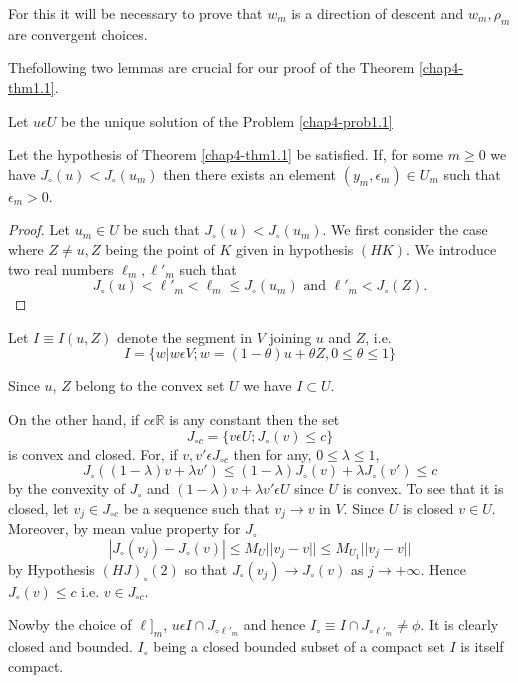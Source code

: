For this it will be necessary to prove that $w_{m}$ is a direction of descent and $w_{m}, \rho_{m}$ are convergent choices.

The\pageoriginale following two lemmas are crucial for our proof of the Theorem \ref{chap4-thm1.1}. 

Let $u \epsilon U$ be the unique solution of the Problem \ref{chap4-prob1.1}

\begin{lemma}\label{chap4-lem1.1}
Let the hypothesis of Theorem \ref{chap4-thm1.1} be satisfied. If, for some $m \geq 0$ we have $J_{\circ}(u) < J_{\circ} (u_{m})$ then there exists an element $(y_{m}, \epsilon_{m}) \in U_{m}$ such that $\epsilon_{m} > 0$.
\end{lemma}

\begin{proof}
Let $u_{m} \in U$ be such that $J_{\circ}(u) < J_{\circ}(u_{m})$. We first consider the case where $Z \neq u, Z$ being the point of $K$ given in hypothesis $(HK)$. We introduce two real numbers $\ell_{m}, \ell'_{m}$ such that
$$
J_{\circ}(u) < \ell'_{m} < \ell_{m} \leq J_{\circ} (u_{m}) \text{ and } \ell'_{m} < J_{\circ}(Z).
$$
\end{proof}

Let $I \equiv I(u, Z)$ denote the segment in $V$ joining $u$ and $Z$, i.e.
$$
I = \{w | w \epsilon V ; w = (1-\theta)u + \theta Z, 0 \leq \theta \leq 1\}
$$

Since $u$, $Z$ belong to the convex set $U$ we have $I \subset U$.

On the other hand, if $c \epsilon \mathbb{R}$ is any constant then the set
$$
J_{\circ c} = \{v \epsilon U; J_{\circ} (v) \leq c\}
$$
is convex and closed. For, if $v, v' \epsilon J_{\circ c}$ then for any, $0 \leq \lambda \leq 1$,
$$
J_{\circ} ((1-\lambda)v + \lambda v') \leq (1 - \lambda)J_{\circ}(v) + \lambda J_{\circ} (v') \leq c
$$
by the convexity of $J_{\circ}$ and $(1-\lambda)v + \lambda v' \epsilon U$ since $U$ is convex. To see that it is closed, let $v_{j} \in J_{\circ c}$ be a sequence such that $v_{j} \to v$ in $V$. Since $U$ is closed $v \in U$. Moreover, by mean value property for $J_{\circ}$
$$
|J_{\circ}(v_{j}) - J_{\circ}(v)| \leq M_{U} ||v_{j}-v|| \leq M_{U_{1}} ||v_{j}-v||
$$
by Hypothesis $(HJ)_{\circ} (2)$ so that $J_{\circ} (v_{j}) \to J_{\circ}(v)$ as $j \to + \infty$. Hence $J_{\circ}(v) \leq c$ i.e. $v \in J_{\circ c}$.

Now\pageoriginale by the choice of $\ell]_{m}$, $u \epsilon I \cap J_{\circ \ell'_{m}}$ and hence $I_{\circ} \equiv I \cap J_{\circ \ell'_{m}} \neq \phi$. It is clearly closed and bounded. $I_{\circ}$ being a closed bounded subset of a compact set $I$ is itself compact.

